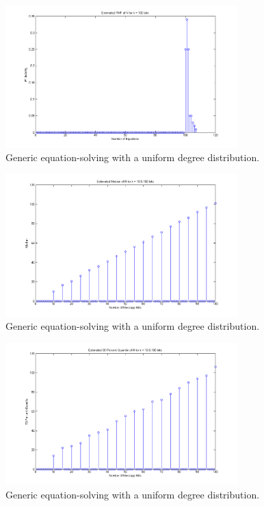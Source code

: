 \documentclass[11pt]{article}
\begin{document}
\begin{enumerate}
    \begin{figure}[H]
        \begin{center}
            \includegraphics[width = 0.8\textwidth]{figure_1a_k100.png}
            \caption{Generic equation-solving with a uniform degree distribution.}
        \end{center}
    \end{figure}

    \begin{figure}[H]
        \begin{center}
            \includegraphics[width = 0.8\textwidth]{figure_1a_median.png}
            \caption{Generic equation-solving with a uniform degree distribution.}
        \end{center}
    \end{figure}

    \begin{figure}[H]
        \begin{center}
            \includegraphics[width = 0.8\textwidth]{figure_1a_90_percent_quantile.png}
            \caption{Generic equation-solving with a uniform degree distribution.}
        \end{center}
    \end{figure}


\end{enumerate}
\end{document}
